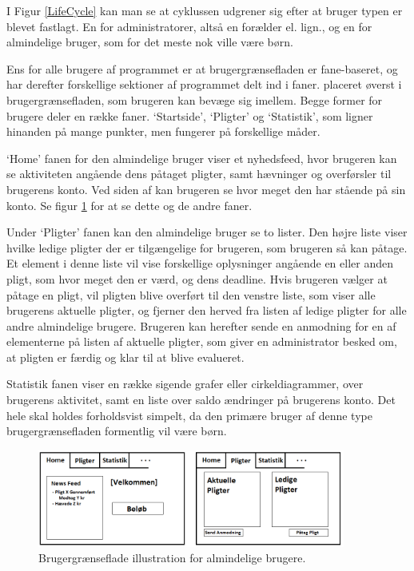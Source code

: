 I Figur \ref{LifeCycle} kan man se at cyklussen udgrener sig efter at bruger typen er blevet fastlagt. En for administratorer, altså en forælder el. lign., og en for almindelige bruger, som for det meste nok ville være børn.

Ens for alle brugere af programmet er at brugergrænsefladen er fane-baseret, og har derefter forskellige sektioner af programmet delt ind i faner. placeret øverst i brugergrænsefladen, som brugeren kan bevæge sig imellem. Begge former for brugere deler en række faner. ‘Startside’, ‘Pligter’ og ‘Statistik’, som ligner hinanden på mange punkter, men fungerer på forskellige måder.

‘Home’ fanen for den almindelige bruger viser et nyhedsfeed, hvor brugeren kan se aktiviteten angående dens påtaget pligter, samt hævninger og overførsler til brugerens konto. Ved siden af kan brugeren se hvor meget den har stående på sin konto. Se figur \ref{BarnUI} for at se dette og de andre faner.

Under ‘Pligter’ fanen kan den almindelige bruger se to lister. Den højre liste viser hvilke ledige pligter der er tilgængelige for brugeren, som brugeren så kan påtage. Et element i denne liste vil vise forskellige oplysninger angående en eller anden pligt, som hvor meget den er værd, og dens deadline. Hvis brugeren vælger at påtage en pligt, vil pligten blive overført til den venstre liste, som viser alle brugerens aktuelle pligter, og fjerner den herved fra listen af ledige pligter for alle andre almindelige brugere. Brugeren kan herefter sende en anmodning for en af elementerne på listen af aktuelle pligter, som giver en administrator besked om, at pligten er færdig og klar til at blive evalueret.

Statistik fanen viser en række sigende grafer eller cirkeldiagrammer, over brugerens aktivitet, samt en liste over saldo ændringer på brugerens konto. Det hele skal holdes forholdsvist simpelt, da den primære bruger af denne type brugergrænsefladen formentlig vil være børn.

\begin{figure}[H]
\centering
\includegraphics[width=0.9\textwidth]{Billeder/BarnUI.png}
\caption{Brugergrænseflade illustration for almindelige brugere.}
\label{BarnUI}
\end{figure}

